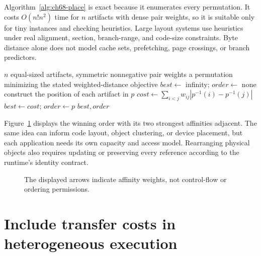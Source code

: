 Algorithm~\ref{alg:ch68-place} is exact because it enumerates every permutation.
It costs $O(n!n^2)$ time for $n$ artifacts with dense pair weights, so it is suitable only for tiny instances and checking heuristics.
Large layout systems use heuristics under real alignment, section, branch-range, and code-size constraints.
Byte distance alone does not model cache sets, prefetching, page crossings, or branch predictors.

\begin{algorithm}[htbp]
\caption{Find the exact optimum of the small unit-slot placement model.}
\label{alg:ch68-place}
\begin{pseudocode}
\Require $n$ equal-sized artifacts, symmetric nonnegative pair weights
\Ensure a permutation minimizing the stated weighted-distance objective
\State $best\gets$ infinity; $order\gets$ none
  \State construct the position of each artifact in $p$
  \State $cost\gets\sum_{i<j}w_{ij}|p^{-1}(i)-p^{-1}(j)|$
    \State $best\gets cost$; $order\gets p$
  \EndIf
\EndFor
\State \Return $best,order$
\end{pseudocode}
\end{algorithm}

Figure~\ref{fig:ch68-placement} displays the winning order with its two strongest affinities adjacent.
The same idea can inform code layout, object clustering, or device placement, but each application needs its own capacity and access model.
Rearranging physical objects also requires updating or preserving every reference according to the runtime's identity contract.

\begin{figure}[htbp]
\centering
{}
\caption{The displayed arrows indicate affinity weights, not control-flow or ordering permissions.}
\label{fig:ch68-placement}
\end{figure}

\section{Include transfer costs in heterogeneous execution}
\label{sec:ch68-heterogeneous}

